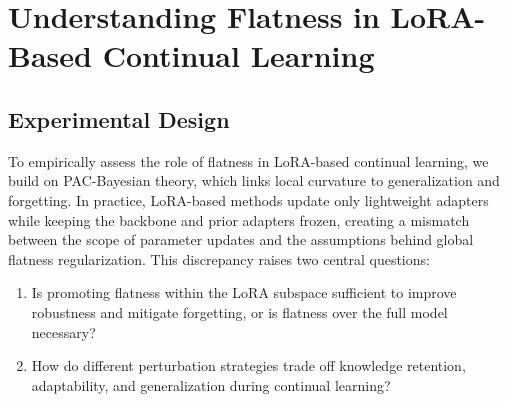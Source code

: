 \documentclass[letterpaper]{article} %
\begin{document}
\section{Understanding Flatness in LoRA-Based Continual Learning}



\subsection{Experimental Design}


To empirically assess the role of flatness in LoRA-based continual learning, we build on PAC-Bayesian theory, which links local curvature to generalization and forgetting. In practice, LoRA-based methods update only lightweight adapters while keeping the backbone and prior adapters frozen, creating a mismatch between the scope of parameter updates and the assumptions behind global flatness regularization. This discrepancy raises two central questions:
\begin{enumerate}
    \item Is promoting flatness within the LoRA subspace sufficient to improve robustness and mitigate forgetting, or is flatness over the full model necessary?
    \item How do different perturbation strategies trade off knowledge retention, adaptability, and generalization during continual learning?
\end{enumerate}
\end{document}
